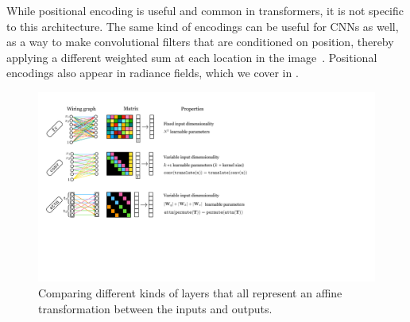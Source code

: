 While positional encoding is useful and common in transformers, it is not specific to this architecture. The same kind of encodings can be useful for CNNs as well, as a way to make convolutional filters that are conditioned on position, thereby applying a different weighted sum at each location in the image~\cite{liu2018intriguing}. Positional encodings also appear in radiance fields, which we cover in \chap{\ref{chapter:nerfs}}. %






\begin{figure}[t]
    \centerline{
        \includegraphics[width=1.0\linewidth]{figures/transformers/affine_layer_comparison.pdf}
    }
    \caption{Comparing different kinds of layers that all represent an affine transformation between the inputs and outputs.}
  \label{fig:transformers:affine_layer_comparison}
\end{figure}


